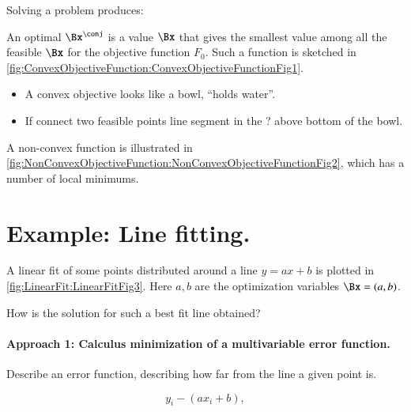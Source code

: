 Solving a problem produces:

An optimal \(\Bx^\conj\) is a value \( \Bx \) that gives the smallest value among all the feasible \( \Bx \) for the objective function \( F_0 \).  Such a function is sketched in \cref{fig:ConvexObjectiveFunction:ConvexObjectiveFunctionFig1}.


\begin{itemize}
\item A convex objective looks like a bowl, ``holds water''.
\item If connect two feasible points line segment in the ? above bottom of the bowl.
\end{itemize}

A non-convex function is illustrated in \cref{fig:NonConvexObjectiveFunction:NonConvexObjectiveFunctionFig2}, which has a number of local minimums.


\section{Example: Line fitting.}

A linear fit of some points distributed around a line \( y = a x + b \) is plotted in \cref{fig:LinearFit:LinearFitFig3}.  Here \( a, b \) are the optimization variables \( \Bx = (a, b) \).


How is the solution for such a best fit line obtained?

\paragraph{Approach 1:  Calculus minimization of a multivariable error function.}

Describe an error function, describing how far from the line a given point is.

\begin{dmath}\label{eqn:L1introduction:100}
y_i - (a x_i + b),
\end{dmath}

